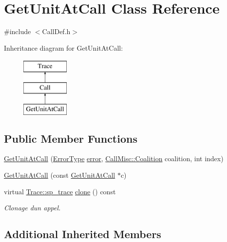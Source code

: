 \hypertarget{class_get_unit_at_call}{}\section{Get\+Unit\+At\+Call Class Reference}
\label{class_get_unit_at_call}


{\ttfamily \#include $<$Call\+Def.\+h$>$}

Inheritance diagram for Get\+Unit\+At\+Call\+:\begin{figure}[H]
\begin{center}
\leavevmode
\includegraphics[height=3.000000cm]{class_get_unit_at_call}
\end{center}
\end{figure}
\subsection*{Public Member Functions}
\begin{DoxyCompactItemize}
\item 
\hyperlink{class_get_unit_at_call_a79690d8748e9c015991143cdef23bcfb}{Get\+Unit\+At\+Call} (\hyperlink{class_call_ade833a08ce215aaa4121102f3448c898}{Error\+Type} \hyperlink{class_call_a206f6150a8038fda48c17c2c7421aed1}{error}, \hyperlink{namespace_call_misc_a490b3c2ef1a821675848ebcab0b677d8}{Call\+Misc\+::\+Coalition} coalition, int index)
\item 
\hyperlink{class_get_unit_at_call_a7b3aebc0b99a514aac2b265e8130f8ab}{Get\+Unit\+At\+Call} (const \hyperlink{class_get_unit_at_call}{Get\+Unit\+At\+Call} $\ast$c)
\item 
virtual \hyperlink{class_trace_a9c58e523529fc8a03fb6acf3eef86150}{Trace\+::sp\+\_\+trace} \hyperlink{class_get_unit_at_call_a228108026f5f8522a6724e1183e1b6bb}{clone} () const 
\begin{DoxyCompactList}\small\item\em Clonage d\textquotesingle{}un appel. \end{DoxyCompactList}\end{DoxyCompactItemize}
\subsection*{Additional Inherited Members}


